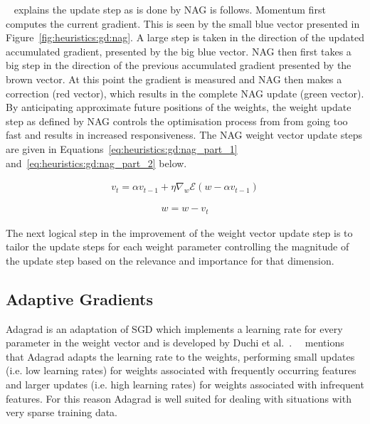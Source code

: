 \citeauthor{ref:ruder:2016}~\cite{ref:ruder:2016} explains the update step as is done by \ac{NAG} is follows. \ac{Momentum} first computes the current gradient. This is seen by the small blue vector presented in Figure~\ref{fig:heuristics:gd:nag}. A large step is taken in the direction of the updated accumulated gradient, presented by the big blue vector. \ac{NAG} then first takes a big step in the direction of the previous accumulated gradient presented by the brown vector. At this point the gradient is measured and \ac{NAG} then makes a correction (red vector), which results in the complete NAG update (green vector). By anticipating approximate future positions of the weights, the weight update step as defined by \ac{NAG} controls the optimisation process from from going too fast and results in increased responsiveness. The \ac{NAG} weight vector update steps are given in Equations~\ref{eq:heuristics:gd:nag_part_1} and~\ref{eq:heuristics:gd:nag_part_2} below.

\begin{equation}
      \label{eq:heuristics:gd:nag_part_1}
      \begin{split}
            v_{t} = \alpha v_{t-1} + \eta \nabla_{w}\mathcal{E}(w - \alpha v_{t-1})
      \end{split}
\end{equation}

\begin{equation}
      \label{eq:heuristics:gd:nag_part_2}
      \begin{split}
            w = w - v_{t}
      \end{split}
\end{equation}

The next logical step in the improvement of the weight vector update step is to tailor the update steps for each weight parameter controlling the magnitude of the update step based on the relevance and importance for that dimension.

\subsection{Adaptive Gradients}
\label{sec:heuristics:adagrad}

\Acl{Adagrad} is an adaptation of \ac{SGD} which implements a learning rate for every parameter in the weight vector and is developed by Duchi et al.~\cite{ref:duchi:2011}.~\citeauthor{ref:ruder:2016}~\cite{ref:ruder:2016} mentions that \Ac{Adagrad} adapts the learning rate to the weights, performing small updates (i.e. low learning rates) for weights associated with frequently occurring features and larger updates (i.e. high learning rates) for weights associated with infrequent features. For this reason \ac{Adagrad} is well suited for dealing with situations with very sparse training data.

